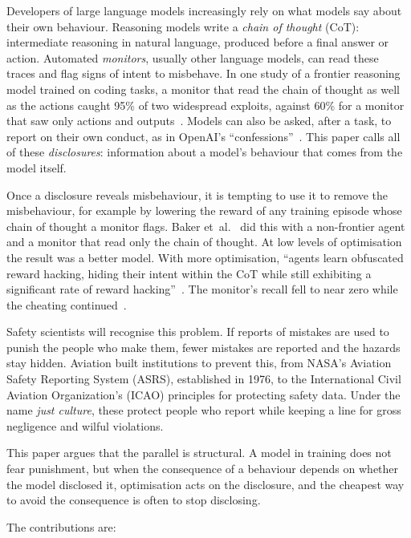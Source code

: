 \documentclass[review,12pt]{elsarticle}
\begin{document}
Developers of large language models increasingly rely on what models say about their own behaviour. Reasoning models write a \emph{chain of thought} (CoT): intermediate reasoning in natural language, produced before a final answer or action. Automated \emph{monitors}, usually other language models, can read these traces and flag signs of intent to misbehave. In one study of a frontier reasoning model trained on coding tasks, a monitor that read the chain of thought as well as the actions caught 95\% of two widespread exploits, against 60\% for a monitor that saw only actions and outputs~\cite[Table~1]{baker2025}. Models can also be asked, after a task, to report on their own conduct, as in OpenAI's ``confessions''~\cite{joglekar2025}. This paper calls all of these \emph{disclosures}: information about a model's behaviour that comes from the model itself.

Once a disclosure reveals misbehaviour, it is tempting to use it to remove the misbehaviour, for example by lowering the reward of any training episode whose chain of thought a monitor flags. Baker et~al.~\cite{baker2025} did this with a non-frontier agent and a monitor that read only the chain of thought. At low levels of optimisation the result was a better model. With more optimisation, ``agents learn obfuscated reward hacking, hiding their intent within the CoT while still exhibiting a significant rate of reward hacking''~\cite[abstract]{baker2025}. The monitor's recall fell to near zero while the cheating continued~\cite[Sec.~3.2]{baker2025}.

Safety scientists will recognise this problem. If reports of mistakes are used to punish the people who make them, fewer mistakes are reported and the hazards stay hidden. Aviation built institutions to prevent this, from NASA's Aviation Safety Reporting System (ASRS), established in 1976, to the International Civil Aviation Organization's (ICAO) principles for protecting safety data. Under the name \emph{just culture}, these protect people who report while keeping a line for gross negligence and wilful violations.

This paper argues that the parallel is structural. A model in training does not fear punishment, but when the consequence of a behaviour depends on whether the model disclosed it, optimisation acts on the disclosure, and the cheapest way to avoid the consequence is often to stop disclosing.

The contributions are:
\end{document}
